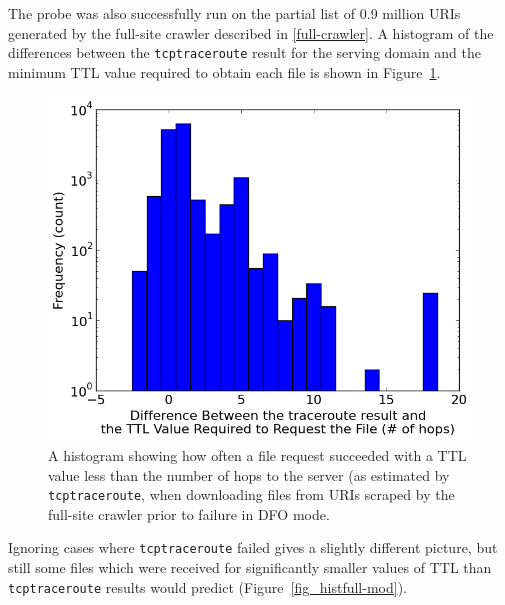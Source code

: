 The probe was also successfully run on the partial list of 0.9 million URIs generated by the full-site crawler described in \autoref{full-crawler}.
A histogram of the differences between the \texttt{tcptraceroute} result for the serving domain and the minimum TTL value required to obtain each file is shown in Figure~\ref{fig_histfull}.
\begin{figure}
	\includegraphics[width=\columnwidth]{figures/histfull}
	\caption{
		A histogram showing how often a file request succeeded with a TTL value less than the number of hops to the server (as estimated by \texttt{tcptraceroute}, when downloading files from URIs scraped by the full-site crawler prior to failure in DFO mode.
	}
	\label{fig_histfull}
\end{figure}
Ignoring cases where \texttt{tcptraceroute} failed gives a slightly different picture, but still some files which were received for significantly smaller values of TTL than \texttt{tcptraceroute} results would predict (Figure~\ref{fig_histfull-mod}).
